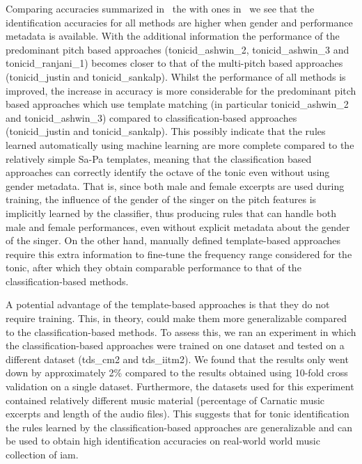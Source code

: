 {{Comparing accuracies summarized in~ the with ones in~ we see that the identification accuracies for all methods are higher when gender and performance metadata is available. With the additional information the performance of the predominant pitch based approaches (\acrshort{tonicid_ashwin_2}, \acrshort{tonicid_ashwin_3} and \acrshort{tonicid_ranjani_1}) becomes closer to that of the multi-pitch based approaches (\acrshort{tonicid_justin} and \acrshort{tonicid_sankalp}). Whilst the performance of all methods is improved, the increase in accuracy is more considerable for the predominant pitch based approaches which use template matching (in particular \acrshort{tonicid_ashwin_2} and \acrshort{tonicid_ashwin_3}) compared to classification-based approaches (\acrshort{tonicid_justin} and \acrshort{tonicid_sankalp}). This possibly indicate that the rules learned automatically using machine learning are more complete compared to the relatively simple Sa-Pa templates, meaning that the classification based approaches can correctly identify the octave of the tonic even without using gender metadata. That is, since both male and female excerpts are used during training, the influence of the gender of the singer on the pitch features is implicitly learned by the classifier, thus producing rules that can handle both male and female performances, even without explicit metadata about the gender of the singer. On the other hand, manually defined template-based approaches require this extra information to fine-tune the frequency range
considered for the tonic, after which they obtain comparable performance to that of the classification-based methods.

A potential advantage of the template-based approaches is that they do not require training. This, in theory, could make them more generalizable compared
to the classification-based methods. To assess this, we ran an experiment in which the classification-based approaches were trained on one dataset and tested on a different dataset (\acrshort{tds_cm2} and \acrshort{tds_iitm2}). We found that the results only went down by approximately 2\% compared to the results obtained using 10-fold cross validation on a single dataset. Furthermore, the datasets used for this experiment contained relatively different music material (percentage of Carnatic music excerpts and length of the audio files). This suggests that for tonic identification the rules learned by the classification-based approaches are generalizable and can be used to obtain high identification accuracies on real-world world music collection of \gls{iam}.


}}
